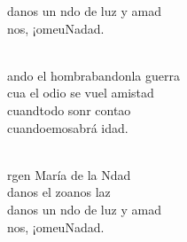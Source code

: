 \documentclass[12pt]{article}
\begin{document}
\begin{multicols*}{2}
\begin{cancion}
\begin{chorus}
	danos un ndo de luz y amad\\
	nos, ¡omeuNadad.\\
	\end{chorus}%
	\jump\\
	ando el hombrabandonla guerra\\
	cua el odio se vuel amistad\\
	cuandtodo sonr contao\\
	cuandoemosabrá idad.\\\jump\\
	\begin{chorus}%
	rgen María de la Ndad\\
	danos el zoanos laz\\
	danos un ndo de luz y amad\\
	nos, ¡omeuNadad.\\
	\end{chorus}%
	\jump\\
\end{cancion}%


\end{multicols*}
\end{document}
